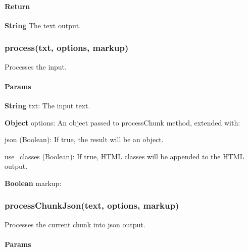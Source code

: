 \paragraph*{Return}


\begin{DoxyItemize}
\item {\bfseries String} The text output.
\end{DoxyItemize}

\subsubsection*{{\ttfamily process(txt, options, markup)}}

Processes the input.

\paragraph*{Params}


\begin{DoxyItemize}
\item {\bfseries String} {\ttfamily txt}\+: The input text.
\item {\bfseries Object} {\ttfamily options}\+: An object passed to {\ttfamily process\+Chunk} method, extended with\+:
\begin{DoxyItemize}
\item {\ttfamily json} (Boolean)\+: If {\ttfamily true}, the result will be an object.
\item {\ttfamily use\+\_\+classes} (Boolean)\+: If {\ttfamily true}, H\+T\+ML classes will be appended to the H\+T\+ML output.
\end{DoxyItemize}
\item {\bfseries Boolean} {\ttfamily markup}\+:
\end{DoxyItemize}

\subsubsection*{{\ttfamily process\+Chunk\+Json(text, options, markup)}}

Processes the current chunk into json output.

\paragraph*{Params}


